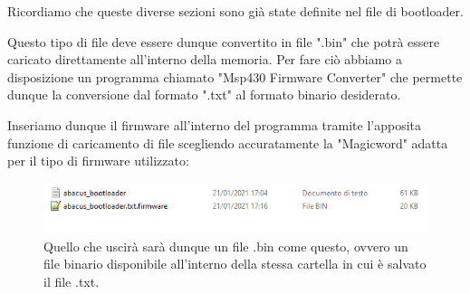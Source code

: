 \documentclass[LaM,binding=0.6cm]{../sapthesis}
\begin{document}
Ricordiamo che queste diverse sezioni sono già state definite nel file di bootloader.

Questo tipo di file deve essere dunque convertito in file ".bin" che potrà essere caricato direttamente all'interno della memoria.
\vspace{0.5cm}
Per fare ciò abbiamo a disposizione un programma chiamato "Msp430 Firmware Converter" che permette dunque la conversione dal formato ".txt" al formato binario desiderato.

Inseriamo dunque il firmware all'interno del programma tramite l'apposita funzione di caricamento di file scegliendo accuratamente la "Magicword" adatta per il tipo di firmware utilizzato:

\begin{figure}[htbp]
\centerline{\includegraphics[scale=0.76]{examples/FileTiConverter.PNG}}
\caption{Quello che uscirà sarà dunque un file .bin come questo, ovvero un file binario disponibile all'interno della stessa cartella in cui è salvato il file .txt.}
\label{fig}
\end{figure}
\newline
\end{document}
